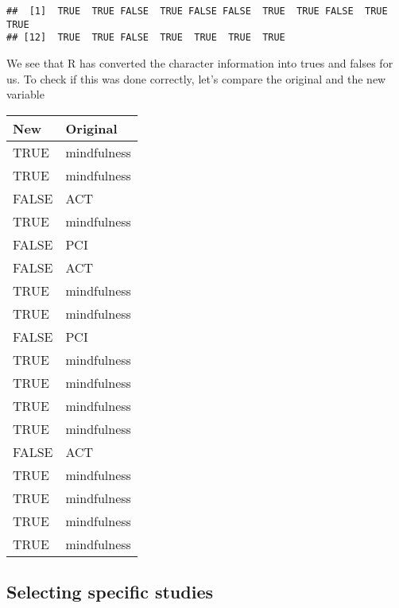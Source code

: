 \documentclass[]{book}
\newenvironment{Shaded}{\begin{snugshade}}{\end{snugshade}}
\newcommand{\KeywordTok}[1]{\textcolor[rgb]{0.13,0.29,0.53}{\textbf{#1}}}
\newcommand{\DataTypeTok}[1]{\textcolor[rgb]{0.13,0.29,0.53}{#1}}
\newcommand{\StringTok}[1]{\textcolor[rgb]{0.31,0.60,0.02}{#1}}
\newcommand{\OperatorTok}[1]{\textcolor[rgb]{0.81,0.36,0.00}{\textbf{#1}}}
\newcommand{\NormalTok}[1]{#1}
\theoremstyle{definition}
\theoremstyle{definition}
\theoremstyle{definition}
\theoremstyle{remark}
\begin{document}
\begin{verbatim}
##  [1]  TRUE  TRUE FALSE  TRUE FALSE FALSE  TRUE  TRUE FALSE  TRUE  TRUE
## [12]  TRUE  TRUE FALSE  TRUE  TRUE  TRUE  TRUE
\end{verbatim}

We see that R has converted the character information into trues and
falses for us. To check if this was done correctly, let's compare the
original and the new variable

\begin{Shaded}
\end{Shaded}

\begin{tabular}{l|l}
\hline
New & Original\\
\hline
TRUE & mindfulness\\
\hline
TRUE & mindfulness\\
\hline
FALSE & ACT\\
\hline
TRUE & mindfulness\\
\hline
FALSE & PCI\\
\hline
FALSE & ACT\\
\hline
TRUE & mindfulness\\
\hline
TRUE & mindfulness\\
\hline
FALSE & PCI\\
\hline
TRUE & mindfulness\\
\hline
TRUE & mindfulness\\
\hline
TRUE & mindfulness\\
\hline
TRUE & mindfulness\\
\hline
FALSE & ACT\\
\hline
TRUE & mindfulness\\
\hline
TRUE & mindfulness\\
\hline
TRUE & mindfulness\\
\hline
TRUE & mindfulness\\
\hline
\end{tabular}

\hypertarget{select}{\subsection{Selecting specific
studies}\label{select}}
\end{document}
